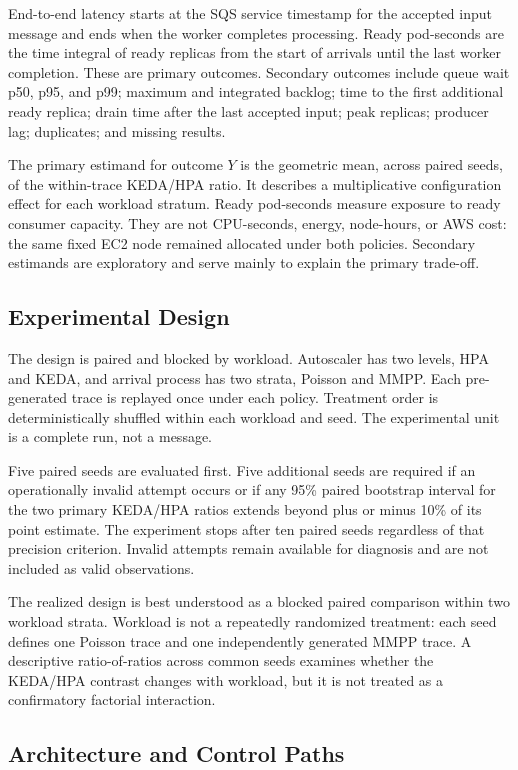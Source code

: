 \documentclass[conference]{IEEEtran}
\begin{document}
End-to-end latency starts at the SQS service timestamp for the accepted input
message and ends when the worker completes processing. Ready pod-seconds are the
time integral of ready replicas from the start of arrivals until the last worker
completion. These are primary outcomes. Secondary outcomes include queue wait
p50, p95, and p99; maximum and integrated backlog; time to the first additional
ready replica; drain time after the last accepted input; peak replicas;
producer lag; duplicates; and missing results.

The primary estimand for outcome $Y$ is the geometric mean, across paired seeds,
of the within-trace KEDA/HPA ratio. It describes a multiplicative configuration
effect for each workload stratum. Ready pod-seconds measure exposure to ready
consumer capacity. They are not CPU-seconds, energy, node-hours, or AWS cost:
the same fixed EC2 node remained allocated under both policies. Secondary
estimands are exploratory and serve mainly to explain the primary trade-off.

\subsection{Experimental Design}

The design is paired and blocked by workload. Autoscaler has two levels, HPA
and KEDA, and arrival process has two strata, Poisson and MMPP. Each pre-generated trace
is replayed once under each policy. Treatment order is deterministically
shuffled within each workload and seed. The experimental unit is a complete
run, not a message.

Five paired seeds are evaluated first. Five additional seeds are required if an
operationally invalid attempt occurs or if any 95\% paired bootstrap interval
for the two primary KEDA/HPA ratios extends beyond plus or minus 10\% of its
point estimate. The experiment stops after ten paired seeds regardless of that
precision criterion. Invalid attempts remain available for diagnosis and are
not included as valid observations.

The realized design is best understood as a blocked paired comparison within
two workload strata. Workload is not a repeatedly randomized treatment: each
seed defines one Poisson trace and one independently generated MMPP trace. A
descriptive ratio-of-ratios across common seeds examines whether the KEDA/HPA
contrast changes with workload, but it is not treated as a confirmatory
factorial interaction.

\subsection{Architecture and Control Paths}
\end{document}
